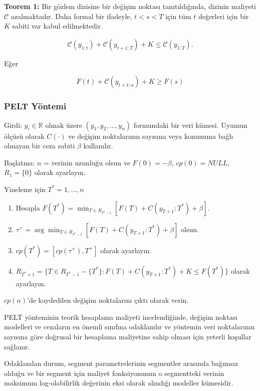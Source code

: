 \documentclass[12pt,twoside]{deuthesis}
\begin{document}
\textbf{Teorem 1:} Bir gözlem dizisine bir değişim noktası tanıtıldığında, dizinin maliyeti \(\mathcal{C}\) azalmaktadır. Daha formal bir ifadeyle, \(t < s < T\) için tüm \(t\) değerleri için bir \(K\) sabiti var kabul edilmektedir.

\[
\mathcal{C}(y_{1:t}) + \mathcal{C}(y_{t+1:T}) + K \leq \mathcal{C}(y_{1:T}).
\]

Eğer

\[
F(t) + \mathcal{C}(y_{t+1:a}) + K \geq F(s)
\]

\hypertarget{pelt-yuxf6ntemi}{%
\subsubsection{PELT Yöntemi}\label{pelt-yuxf6ntemi}}

Girdi: \(y_i \in \mathbb{R}\) olmak üzere \((y_1, y_2, \ldots, y_n)\) formundaki bir veri kümesi. Uyumun ölçüsü olarak \(C(\cdot)\) ve değişim noktalarının sayısına veya konumuna bağlı olmayan bir ceza sabiti \(\beta\) kullanılır.

Başlatma: \(n\) = verinin uzunluğu olsun ve \(F(0) = -\beta\), \(cp(0) = NULL\), \(R_1 = \{0\}\) olarak ayarlayın.

Yineleme için \(T^* = 1, \ldots, n\)

\begin{enumerate}
\def\labelenumi{\arabic{enumi}.}
\item
  Hesapla \(F(T^*) = \min_{T \in R_{T^*-1}} [F(T) + C(y_{T+1}:T^*) + \beta]\).
\item
  \(\tau^+ = \arg \min_{T \in R_{T^*-1}} [F(T) + C(y_{T+1}:T^*) + \beta]\) olsun.
\item
  \(cp(T^*) = [cp(\tau^+), T^+]\) olarak ayarlayın.
\item
  \(R_{T^*+1} = \{T \in R_{T^*-1} - \{T^*\} : F(T) + C(y_{T+1}:T^*) + K \leq F(T^*)\}\) olarak ayarlayın.
\end{enumerate}

\(cp(n)\)'de kaydedilen değişim noktalarını çıktı olarak verin.

PELT yönteminin teorik hesaplama maliyeti incelendiğinde, değişim noktası modelleri ve cezaların en önemli sınıfına odaklanılır ve yöntemin veri noktalarının sayısına göre doğrusal bir hesaplama maliyetine sahip olması için yeterli koşullar sağlanır.

Odaklanılan durum, segment parametrelerinin segmentler arasında bağımsız olduğu ve bir segment için maliyet fonksiyonunun o segmentteki verinin maksimum log-olabilirlik değerinin eksi olarak alındığı modeller kümesidir.
\end{document}
